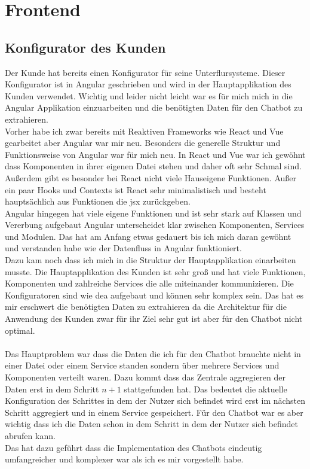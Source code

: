 \section{Frontend}\label{sec:umsetzung_frontend}
\subsection{Konfigurator des Kunden}\label{sec:umsetzung_konfigurator}
Der Kunde hat bereits einen Konfigurator für seine Unterflursysteme. Dieser Konfigurator ist in Angular geschrieben und wird in der Hauptapplikation des Kunden verwendet.
Wichtig und leider nicht leicht war es für mich mich in die Angular Applikation einzuarbeiten und die benötigten Daten für den Chatbot zu extrahieren.\\
Vorher habe ich zwar bereits mit Reaktiven Frameworks wie React und Vue gearbeitet aber Angular war mir neu. Besonders die generelle Struktur und Funktionsweise von Angular war für mich neu.
In React und Vue war ich gewöhnt dass Komponenten in ihrer eigenen Datei stehen und daher oft sehr Schmal sind. Außerdem gibt es besonder bei React nicht viele
Hauseigene Funktionen. Außer ein paar Hooks und Contexts ist React sehr minimalistisch und besteht hauptsächlich aus Funktionen die \gls{jsx} zurückgeben.\\
Angular hingegen hat viele eigene Funktionen und ist sehr stark auf Klassen und Vererbung aufgebaut Angular unterscheidet klar zwischen Komponenten, Services und Modulen.
Das hat am Anfang etwas gedauert bis ich mich daran gewöhnt und verstanden habe wie der Datenfluss in Angular funktioniert.\\
Dazu kam noch dass ich mich in die Struktur der Hauptapplikation einarbeiten musste. Die Hauptapplikation des Kunden ist sehr groß und hat viele Funktionen, Komponenten und zahlreiche
Services die alle miteinander kommunizieren. Die Konfiguratoren sind wie \gls{dea} aufgebaut und können sehr komplex sein. Das hat es mir erschwert die benötigten Daten zu extrahieren
da die Architektur für die Anwendung des Kunden zwar für ihr Ziel sehr gut ist aber für den Chatbot nicht optimal.\\\\
Das Hauptproblem war dass die Daten die ich für den Chatbot brauchte nicht in einer Datei oder einem Service standen sondern über mehrere Services und Komponenten verteilt waren.
Dazu kommt dass das Zentrale aggregieren der Daten erst in dem Schritt $n+1$ stattgefunden hat.
Das bedeutet die aktuelle Konfiguration des Schrittes in dem der Nutzer sich befindet wird erst im nächsten Schritt aggregiert und in einem Service gespeichert.
Für den Chatbot war es aber wichtig dass ich die Daten schon in dem Schritt in dem der Nutzer sich befindet abrufen kann.\\
Das hat dazu geführt dass die Implementation des Chatbots eindeutig umfangreicher und komplexer war als ich es mir vorgestellt habe.


